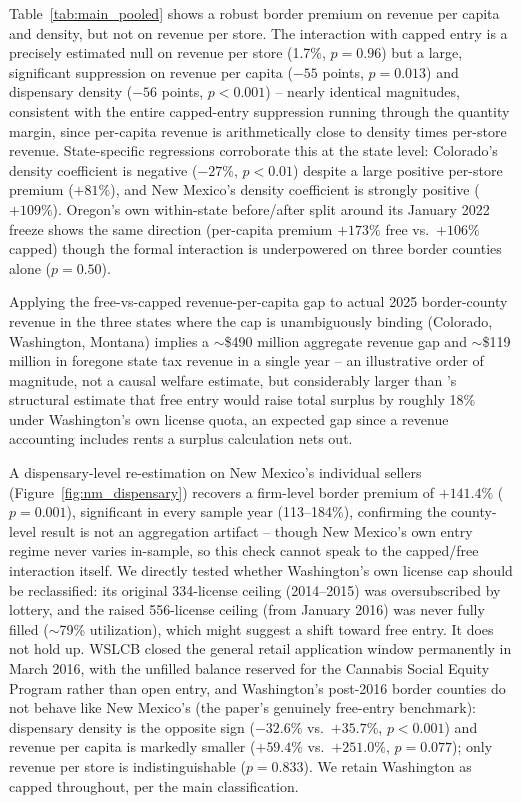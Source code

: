 \documentclass[5p]{elsarticle}
\begin{document}


Table~\ref{tab:main_pooled} shows a robust border premium on revenue per capita and density, but not on
revenue per store. The interaction with capped entry is a precisely estimated null on revenue per store
(1.7\%, $p{=}0.96$) but a large, significant suppression on revenue per capita ($-55$ points, $p{=}0.013$) and
dispensary density ($-56$ points, $p{<}0.001$) -- nearly identical magnitudes, consistent with the entire
capped-entry suppression running through the quantity margin, since per-capita revenue is arithmetically close
to density times per-store revenue. State-specific regressions corroborate this at the state level: Colorado's
density coefficient is negative ($-27\%$, $p{<}0.01$) despite a large positive per-store premium ($+81\%$),
and New Mexico's density coefficient is strongly positive ($+109\%$). Oregon's own within-state before/after
split around its January 2022 freeze shows the same direction (per-capita premium $+173\%$ free vs.\ $+106\%$
capped) though the formal interaction is underpowered on three border counties alone ($p{=}0.50$).

Applying the free-vs-capped revenue-per-capita gap to actual 2025 border-county revenue in the three states
where the cap is unambiguously binding (Colorado, Washington, Montana) implies a $\sim$\$490 million
aggregate revenue gap and $\sim$\$119 million in foregone state tax revenue in a single year -- an
illustrative order of magnitude, not a causal welfare estimate, but considerably larger than
\citet{Thomas2019LicenseQuotas}'s structural estimate that free entry would raise total surplus by roughly
18\% under Washington's own license quota, an expected gap since a revenue accounting includes rents a surplus
calculation nets out.

A dispensary-level re-estimation on New Mexico's individual sellers (Figure~\ref{fig:nm_dispensary}) recovers a
firm-level border premium of $+141.4\%$ ($p{=}0.001$), significant in every sample year (113--184\%), confirming
the county-level result is not an aggregation artifact -- though New Mexico's own entry regime never varies
in-sample, so this check cannot speak to the capped/free interaction itself. We directly tested whether
Washington's own license cap should be reclassified: its original 334-license ceiling (2014--2015) was
oversubscribed by lottery, and the raised 556-license ceiling (from January 2016) was never fully filled
($\sim$79\% utilization), which might suggest a shift toward free entry. It does not hold up. WSLCB closed the
general retail application window permanently in March 2016, with the unfilled balance reserved for the
Cannabis Social Equity Program rather than open entry, and Washington's post-2016 border counties do not
behave like New Mexico's (the paper's genuinely free-entry benchmark): dispensary density is the opposite
sign ($-32.6\%$ vs.\ $+35.7\%$, $p{<}0.001$) and revenue per capita is markedly smaller ($+59.4\%$ vs.\
$+251.0\%$, $p{=}0.077$); only revenue per store is indistinguishable ($p{=}0.833$). We retain Washington as
capped throughout, per the main classification.
\end{document}

